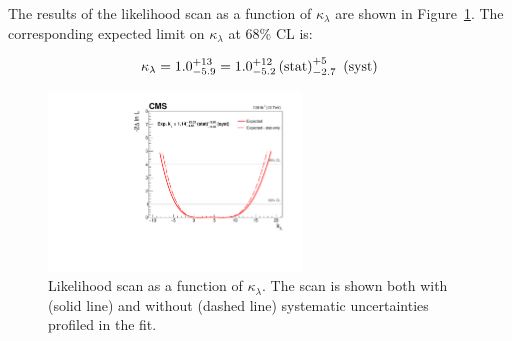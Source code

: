 The results of the likelihood scan as a function of $\kappa_\lambda$ are shown in Figure~\ref{fig:klambda_Scan}. 
The corresponding expected limit on $\kappa_\lambda$ at 68\% CL is:
\begin{linenomath*}
	\begin{equation}
	\kappa_\lambda = 1.0^{+13}_{-5.9} = 1.0^{+12}_{-5.2}\,\text{(stat)}^{+5}_{-2.7}~\,\text{(syst)}
	\end{equation}
\end{linenomath*}
\begin{figure}[!htb]
	\centering
	\includegraphics[width=0.6\textwidth]{Images/H4L/kappaLambda/lhscan_compare_pT4l_kL_kappa_lambda.pdf}
	\caption{
		Likelihood scan as a function of $\kappa_\lambda$.
		The scan is shown both with (solid line) and without (dashed line) systematic uncertainties profiled in the fit.
		\label{fig:klambda_Scan}}
\end{figure}

